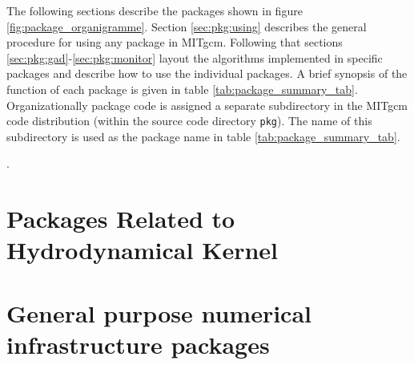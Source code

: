 The following sections describe the packages shown in 
figure \ref{fig:package_organigramme}. Section \ref{sec:pkg:using}
describes the general procedure for using any package in MITgcm.
Following that sections \ref{sec:pkg:gad}-\ref{sec:pkg:monitor} 
layout the algorithms implemented in specific packages
and describe how to use the individual packages. A brief synopsis of the 
function of each package is given in table \ref{tab:package_summary_tab}.
Organizationally package code is assigned a
separate subdirectory in the MITgcm code distribution
(within the source code directory \texttt{pkg}).
The name of this subdirectory is used as the package name in
table \ref{tab:package_summary_tab}.


\begin{table}
\caption{~}
\label{tab:package_summary_tab}.
\end{table}

\newpage


\newpage
\section{Packages Related to Hydrodynamical Kernel}


\newpage


\newpage


\newpage


\newpage


\newpage
\section{General purpose numerical infrastructure packages}


\newpage


\newpage


\newpage
